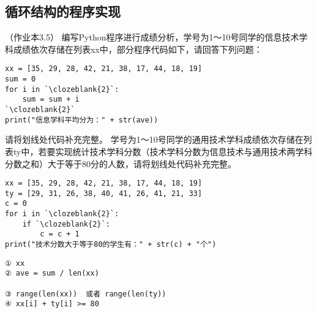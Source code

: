 \setcounter{section}{3}
\setcounter{subsection}{4}
\subsection{循环结构的程序实现}





\begin{groups}


\begin{questions}[rp]

\setcounter{qnumber}{1}
\question （{\kaishu 作业本3.5}）
编写Python程序进行成绩分析，学号为1～10号同学的信息技术学科成绩依次存储在列表xx中，部分程序代码如下，请回答下列问题：
\begin{lstlisting}
xx = [35, 29, 28, 42, 21, 38, 17, 44, 18, 19]
sum = 0
for i in `\clozeblank{2}`:
    sum = sum + i
`\clozeblank{2}`
print("信息学科平均分为：" + str(ave))
\end{lstlisting}

\begin{subquestions}
\subquestion 请将划线处代码补充完整。
\subquestion 学号为1～10号同学的通用技术学科成绩依次存储在列表ty中，若要实现统计技术学科分数（技术学科分数为信息技术与通用技术两学科分数之和）大于等于80分的人数，请将划线处代码补充完整。
\begin{lstlisting}
xx = [35, 29, 28, 42, 21, 38, 17, 44, 18, 19]
ty = [29, 31, 26, 38, 40, 41, 26, 41, 21, 33]
c = 0
for i in `\clozeblank{2}`:
    if `\clozeblank{2}`:
        c = c + 1
print("技术分数大于等于80的学生有：" + str(c) + "个")

\end{lstlisting}
\end{subquestions}




\begin{solution}
\begin{lstlisting}
① xx
② ave = sum / len(xx)

③ range(len(xx))  或者 range(len(ty))
④ xx[i] + ty[i] >= 80
\end{lstlisting}
\end{solution}




\end{questions}
\end{groups}
